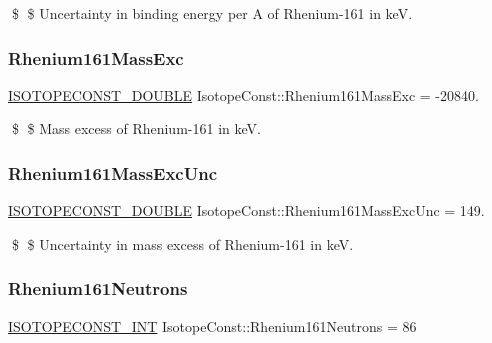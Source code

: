 \$ \$ Uncertainty in binding energy per A of Rhenium-\/161 in keV. \mbox{\label{group___isotope_const-_rhenium-_re161_gaa279a30868a693c6e6da3ddecf6ee3dc}} 
\subsubsection{\texorpdfstring{Rhenium161\+Mass\+Exc}{Rhenium161MassExc}}
{\footnotesize\ttfamily \mbox{\hyperlink{group___isotope_const-_macros_ga8f45a7272ce02c0b4c65c44636ed719a}{I\+S\+O\+T\+O\+P\+E\+C\+O\+N\+S\+T\+\_\+\+D\+O\+U\+B\+LE}} Isotope\+Const\+::\+Rhenium161\+Mass\+Exc = -\/20840.}

\$ \$ Mass excess of Rhenium-\/161 in keV. \mbox{\label{group___isotope_const-_rhenium-_re161_gab64644098d3863a872e8c80745fb059e}} 
\subsubsection{\texorpdfstring{Rhenium161\+Mass\+Exc\+Unc}{Rhenium161MassExcUnc}}
{\footnotesize\ttfamily \mbox{\hyperlink{group___isotope_const-_macros_ga8f45a7272ce02c0b4c65c44636ed719a}{I\+S\+O\+T\+O\+P\+E\+C\+O\+N\+S\+T\+\_\+\+D\+O\+U\+B\+LE}} Isotope\+Const\+::\+Rhenium161\+Mass\+Exc\+Unc = 149.}

\$ \$ Uncertainty in mass excess of Rhenium-\/161 in keV. \mbox{\label{group___isotope_const-_rhenium-_re161_gabbef2c2648a8e0d8a62416048aac8286}} 
\subsubsection{\texorpdfstring{Rhenium161\+Neutrons}{Rhenium161Neutrons}}
{\footnotesize\ttfamily \mbox{\hyperlink{group___isotope_const-_macros_ga5f18360b3e99483a35c32d789e62621c}{I\+S\+O\+T\+O\+P\+E\+C\+O\+N\+S\+T\+\_\+\+I\+NT}} Isotope\+Const\+::\+Rhenium161\+Neutrons = 86}

